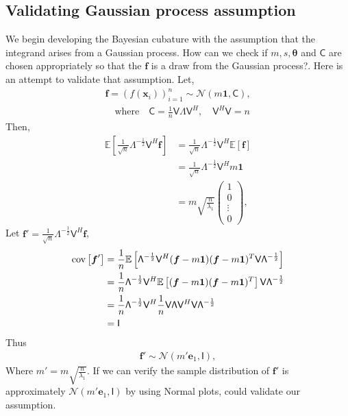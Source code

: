 \documentclass[twocolumn]{svjour3}          %
\newcommand{\bm}[1]{\boldsymbol{#1}}
\newcommand{\Ex}{\mathbb{E}}
\newcommand{\vtheta}{{\bm{\theta}}}
\newcommand{\vf}{\bm{f}}
\newcommand{\vx}{\bm{x}}
\newcommand{\vone}{\bm{1}}
\newcommand{\mC}{\mathsf{C}}
\newcommand{\cov}{{\textup{cov}}}
\newcommand{\mLambda}{\mathsf{\Lambda}}
\newcommand{\mV}{\mathsf{V}}
\newcommand{\calN}{\mathcal{N}}
\begin{document}
\subsection{Validating Gaussian process assumption}


We begin developing the Bayesian cubature with the assumption that the integrand arises from a Gaussian process. How can we check if $m, s, \vtheta$ and $\mC$ are chosen appropriately so that the $\vf$ is a draw from the Gaussian process?. Here is an attempt to validate that assumption. Let,
\begin{multline*}
\vf = \left( f(\vx_i) \right)_{i=1}^n
\sim \calN \left( m\vone, \mC \right), 
\\
\quad \text{where}\quad \mC = \frac 1n \mV \mLambda \mV^H, \quad \mV^H \mV = n
\end{multline*}
Then,
\begin{align*}
\Ex\left[ \frac{1}{\sqrt{n}} \mLambda^{-\frac 12} \mV^H \vf \right]
& =
\frac{1}{\sqrt{n}} \mLambda^{-\frac 12} \mV^H \Ex[\vf] 
\\
& =
\frac{1}{\sqrt{n}} \mLambda^{-\frac 12} \mV^H m \vone
\\
& = m \sqrt{\frac{n}{\lambda_1}} \left( 
\begin{array}{c}
1 \\ 0 \\ \vdots \\ 0
\end{array}
\right),
\end{align*}
Let $\vf' = \frac{1}{\sqrt{n}} \mLambda^{-\frac 12} \mV^H \vf$,
\begin{align*}
\cov \left[ \vf'  \right]
&=
\frac{1}{n} \Ex\left[  
\mLambda^{-\frac 12} \mV^H (\vf - m \vone)
(\vf - m \vone)^T \mV \mLambda^{-\frac 12}
\right]
\\
&=
\frac{1}{n} \mLambda^{-\frac 12} \mV^H 
\Ex\left[ (\vf - m \vone)
(\vf - m \vone)^T \right] \mV \mLambda^{-\frac 12}
\\
&=
\frac{1}{n} \mLambda^{-\frac 12} \mV^H 
\frac 1n \mV \mLambda \mV^H \mV \mLambda^{-\frac 12}
\\
& = \mathsf{I}
\end{align*}
Thus
\begin{align*}
\vf' \sim \calN \left( 
m' \bm{e}_1,
\mathsf{I}
\right),
\end{align*}
Where $m' = m \sqrt{\frac{n}{\lambda_1}} $.
If we can verify the sample distribution of $\vf'$ is approximately $\calN\left( m' \bm{e}_1, \mathsf{I} \right)$ by using Normal plots, could validate our assumption.
\end{document}
